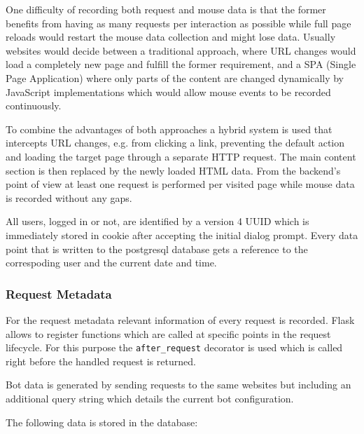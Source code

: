 \documentclass[
    fontsize=12pt,
    headings=small,
    parskip=half,           %
    bibliography=totoc,
    numbers=noenddot,       %
    open=any,               %
    final                   %
]{scrreprt}
\begin{document}
One difficulty of recording both request and mouse data is that the former benefits from having as many requests per interaction as possible while full page reloads would restart the mouse data collection and might lose data. Usually websites would decide between a traditional approach, where URL changes would load a completely new page and fulfill the former requirement, and a SPA (Single Page Application) where only parts of the content are changed dynamically by JavaScript implementations which would allow mouse events to be recorded continuously.

To combine the advantages of both approaches a hybrid system is used that intercepts URL changes, e.g. from clicking a link, preventing the default action and loading the target page through a separate HTTP request. The main content section is then replaced by the newly loaded HTML data. From the backend's point of view at least one request is performed per visited page while mouse data is recorded without any gaps.

All users, logged in or not, are identified by a version 4 UUID which is immediately stored in cookie after accepting the initial dialog prompt. Every data point that is written to the postgresql database gets a reference to the correspoding user and the current date and time.

\subsubsection{Request Metadata}

For the request metadata relevant information of every request is recorded. Flask allows to register functions which are called at specific points in the request lifecycle. For this purpose the \lstinline{after_request} decorator is used which is called right before the handled request is returned.

Bot data is generated by sending requests to the same websites but including an additional query string which details the current bot configuration.

The following data is stored in the database:
\end{document}
